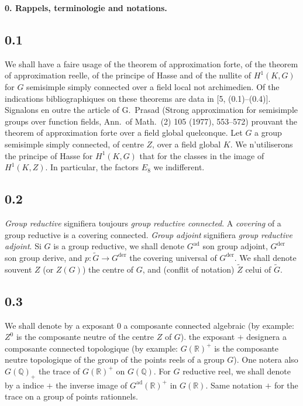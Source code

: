 \documentclass[12pt,a4paper]{article}
\theoremstyle{plain}
\theoremstyle{definition}
\theoremstyle{remark}
\newcommand{\QQ}{\mathbb{Q}}
\newcommand{\RR}{\mathbb{R}}
\begin{document}
\vspace{0.5cm}
\noindent\textbf{0. Rappels, terminologie and notations.}

\subsection*{0.1}

We shall have a faire usage of the theorem of approximation forte, of the theorem of approximation reelle, of the principe of Hasse and of the nullite of $H^1(K,G)$ for $G$ semisimple simply connected over a field local not archimedien. Of the indications bibliographiques on these theorems are data in [5, (0.1)--(0.4)]. Signalons en outre the article of G.~Prasad (Strong approximation for semisimple groups over function fields, Ann.~of Math.~(2) 105 (1977), 553--572) prouvant the theorem of approximation forte over a field global quelconque. Let $G$ a group semisimple simply connected, of centre $Z$, over a field global $K$. We n'utiliserons the principe of Hasse for $H^1(K,G)$ that for the classes in the image of $H^1(K,Z)$. In particular, the factors $E_8$ we indifferent.

\subsection*{0.2}

\textit{Group reductive} signifiera toujours \textit{group reductive connected}. A \textit{covering} of a group reductive is a covering connected. \textit{Group adjoint} signifiera \textit{group reductive adjoint}. Si $G$ is a group reductive, we shall denote $G^{\text{ad}}$ son group adjoint, $G^{\text{der}}$ son group derive, and $p:\tilde{G} \to G^{\text{der}}$ the covering universal of $G^{\text{der}}$. We shall denote souvent $Z$ (or $Z(G)$) the centre of $G$, and (conflit of notation) $\tilde{Z}$ celui of $\tilde{G}$.

\subsection*{0.3}

We shall denote by a exposant $0$ a composante connected algebraic (by example: $Z^0$ is the composante neutre of the centre $Z$ of $G$). the exposant $+$ designera a composante connected topologique (by example: $G(\RR)^+$ is the composante neutre topologique of the group of the points reels of a group $G$). One notera also $G(\QQ)_+$ the trace of $G(\RR)^+$ on $G(\QQ)$. For $G$ reductive reel, we shall denote by a indice $+$ the inverse image of $G^{\text{ad}}(\RR)^+$ in $G(\RR)$. Same notation $+$ for the trace on a group of points rationnels.
\end{document}

